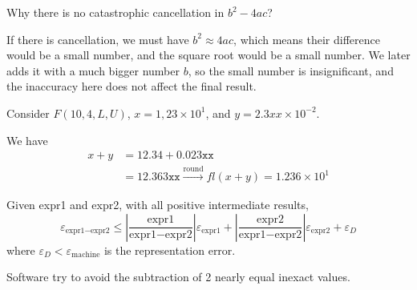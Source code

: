 Why there is no catastrophic cancellation in \( b^2 - 4ac \)?

If there is cancellation, we must have \( b^2 \approx 4ac \), which means their difference would be a small number, and the square root would be a small number. We later adds it with a much bigger number \( b \), so the small number is insignificant, and the inaccuracy here does not affect the final result.

\begin{example}
    Consider \( F(10, 4, L, U) \), \( x = 1,23 \times 10^1 \), and \( y = 2.3xx \times 10^{-2} \).

    We have \begin{align*}
        x + y
         & = 12.34 + 0.023\texttt{xx}                                                 \\
         & = 12.363\texttt{xx} \xrightarrow{\text{round}} fl(x+y) = 1.236 \times 10^1
    \end{align*}
\end{example}

\begin{remark}
    Given expr1 and expr2, with all positive intermediate results, \[
        \varepsilon_{\text{expr1} - \text{expr2}} \leq \left| \frac{\text{expr1}}{\text{expr1}-\text{expr2}} \right| \varepsilon_{\text{expr1}} + \left| \frac{\text{expr2}}{\text{expr1}-\text{expr2}} \right| \varepsilon_{\text{expr2}} + \varepsilon_{D}
    \] where \( \varepsilon_{D} < \varepsilon_{\text{machine}} \) is the representation error.
\end{remark}

\begin{remark}
    Software try to avoid the subtraction of 2 nearly equal inexact values.
\end{remark}

